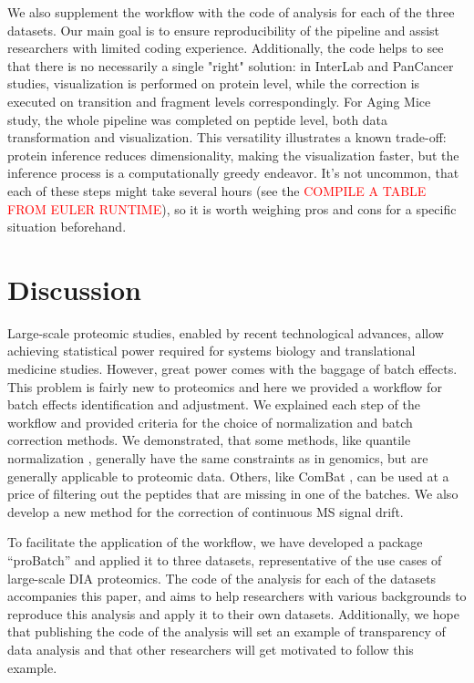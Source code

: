 \documentclass[num-refs]{wiley-article}
\begin{document}
We also supplement the workflow with the code of analysis for each of the three datasets. Our main goal is to ensure reproducibility of the pipeline and assist researchers with limited coding experience. Additionally, the code helps to see that there is no necessarily a single "right" solution: in InterLab and PanCancer studies, visualization is performed on protein level, while the correction is executed on transition and fragment levels correspondingly. For Aging Mice study, the whole pipeline was completed on peptide level, both data transformation and visualization. This versatility illustrates a known trade-off: protein inference reduces dimensionality, making the visualization faster, but the inference process is a computationally greedy endeavor. It's not uncommon, that each of these steps might take several hours (see the \textcolor{red}{COMPILE A TABLE FROM EULER RUNTIME}), so it is worth weighing pros and cons for a specific situation beforehand.


\section{Discussion}
Large-scale proteomic studies, enabled by recent technological advances, allow achieving statistical power required for systems biology and translational medicine studies. However, great power comes with the baggage of batch effects. This problem is fairly new to proteomics and here we provided a workflow for batch effects identification and adjustment. We explained each step of the workflow and provided criteria for the choice of normalization and batch correction methods. We demonstrated, that some methods, like quantile normalization \cite{Bolstad2003}, generally have the same constraints as in genomics, but are generally applicable to proteomic data. Others, like ComBat \cite{Johnson:2007aa}, can be used at a price of filtering out the peptides that are missing in one of the batches. We also develop a new method for the correction of continuous MS signal drift.

To facilitate the application of the workflow, we have developed a package “proBatch” and applied it to three datasets, representative of the use cases of large-scale DIA proteomics. The code of the analysis for each of the datasets accompanies this paper, and aims to help researchers with various backgrounds to reproduce this analysis and apply it to their own datasets. Additionally, we hope that publishing the code of the analysis will set an example of transparency of data analysis and that other researchers will get motivated to follow this example.
\end{document}

